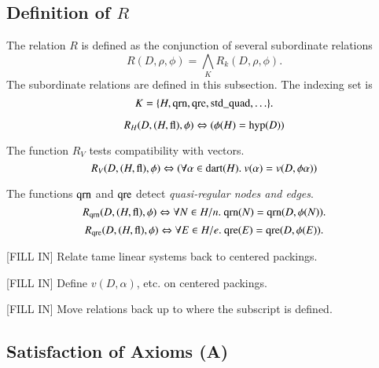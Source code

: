 \subsection{Definition of $R$}

The relation $R$ is defined as the conjunction of several
subordinate relations
    $$R(D,\rho,\phi) = \bigwedge_K R_k (D,\rho,\phi).$$
The subordinate relations are defined in this subsection. The
indexing set is
    $$
    K = \{H,{\operatorname{qrn}},{\operatorname{qre}},{\operatorname{std\_quad}},\ldots\}.
    $$


\begin{definition}
    $$R_H(D,(H,{{\operatorname{fl}}}),\phi) \Leftrightarrow (\phi(H)={\operatorname{hyp}}(D))$$
\end{definition}

\begin{definition}
The function $R_{V}$ tests compatibility with vectors.
    $$R_V(D,(H,{{\operatorname{fl}}}),\phi) \Leftrightarrow
        (\forall \alpha\in {\operatorname{dart}}(H).\ v(\alpha) =
        v(D,\phi\alpha))$$
\end{definition}

\begin{definition}
 The functions ${\operatorname{qrn}}$ and ${\operatorname{qre}}$ detect {\it quasi-regular
 nodes and edges}.
        $$R_{{\operatorname{qrn}}}(D,(H,{\operatorname{fl}}),\phi) \Leftrightarrow
        \forall N\in H/n.\ {\operatorname{qrn}}(N) = {\operatorname{qrn}}(D,\phi(N)).
        $$
        $$R_{{\operatorname{qre}}}(D,(H,{\operatorname{fl}}),\phi) \Leftrightarrow
        \forall E\in H/e.\ {\operatorname{qre}}(E) = {\operatorname{qre}}(D,\phi(E)).
        $$
\end{definition}



[FILL IN]  Relate tame linear systems back to centered packings.

[FILL IN] Define $v(D,\alpha)$, etc. on centered packings.

[FILL IN] Move relations back up to where the subscript is
defined.

\subsection{Satisfaction of Axioms (A)}

